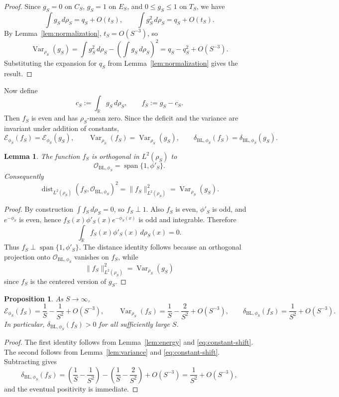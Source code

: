 \documentclass[11pt]{amsart}
\newtheorem{proposition}[theorem]{Proposition}
\newtheorem{lemma}[theorem]{Lemma}
\theoremstyle{remark}
\DeclareMathOperator{\Var}{Var}
\DeclareMathOperator{\dist}{dist}
\DeclareMathOperator{\spanop}{span}
\newcommand{\R}{\mathbb R}
\newcommand{\cO}{\mathcal O}
\newcommand{\BL}{\mathrm{BL}}
\begin{document}
\begin{proof}
Since $g_S=0$ on $C_S$, $g_S=1$ on $E_S$, and $0\le g_S\le 1$ on $T_S$, we
have
\[
  \int g_S\,d\rho_S=q_S+O(t_S),
  \qquad
  \int g_S^2\,d\rho_S=q_S+O(t_S).
\]
By Lemma~\ref{lem:normalization}, $t_S=O(S^{-3})$, so
\[
  \Var_{\rho_S}(g_S)
  =
  \int g_S^2\,d\rho_S-\left(\int g_S\,d\rho_S\right)^2
  =
  q_S-q_S^2+O(S^{-3}).
\]
Substituting the expansion for $q_S$ from
Lemma~\ref{lem:normalization} gives the result.
\end{proof}

Now define
\[
  c_S:=\int_{\R}g_S\,d\rho_S,
  \qquad
  f_S:=g_S-c_S.
\]
Then $f_S$ is even and has $\rho_S$-mean zero. Since the deficit and the
variance are invariant under addition of constants,
\begin{equation}\label{eq:constant-shift}
  \mathcal E_{\phi_S}(f_S)=\mathcal E_{\phi_S}(g_S),
  \qquad
  \Var_{\rho_S}(f_S)=\Var_{\rho_S}(g_S),
  \qquad
  \delta_{\BL,\phi_S}(f_S)=\delta_{\BL,\phi_S}(g_S).
\end{equation}

\begin{lemma}\label{lem:orth}
The function $f_S$ is orthogonal in $L^2(\rho_S)$ to
\[
  \cO_{\BL,\phi_S}=\spanop\{1,\phi'_S\}.
\]
Consequently
\[
  \dist_{L^2(\rho_S)}(f_S,\cO_{\BL,\phi_S})^2
  =
  \|f_S\|_{L^2(\rho_S)}^2
  =
  \Var_{\rho_S}(g_S).
\]
\end{lemma}

\begin{proof}
By construction $\int f_S\,d\rho_S=0$, so $f_S\perp 1$. Also $f_S$ is even,
$\phi'_S$ is odd, and $e^{-\phi_S}$ is even, hence
$f_S(x)\phi'_S(x)e^{-\phi_S(x)}$ is odd and integrable. Therefore
\[
  \int_{\R}f_S(x)\phi'_S(x)\,d\rho_S(x)=0.
\]
Thus $f_S\perp \spanop\{1,\phi'_S\}$. The distance identity follows because an
orthogonal projection onto $\cO_{\BL,\phi_S}$ vanishes on $f_S$, while
\[
  \|f_S\|_{L^2(\rho_S)}^2=\Var_{\rho_S}(g_S)
\]
since $f_S$ is the centered version of $g_S$.
\end{proof}

\begin{proposition}\label{prop:asymptotics}
As $S\to\infty$,
\[
  \mathcal E_{\phi_S}(f_S)=\frac{1}{S}-\frac{1}{S^2}+O(S^{-3}),
  \qquad
  \Var_{\rho_S}(f_S)=\frac{1}{S}-\frac{2}{S^2}+O(S^{-3}),
  \qquad
  \delta_{\BL,\phi_S}(f_S)=\frac{1}{S^2}+O(S^{-3}).
\]
In particular, $\delta_{\BL,\phi_S}(f_S)>0$ for all sufficiently large $S$.
\end{proposition}

\begin{proof}
The first identity follows from Lemma~\ref{lem:energy} and
\eqref{eq:constant-shift}. The second follows from Lemma~\ref{lem:variance}
and \eqref{eq:constant-shift}. Subtracting gives
\[
  \delta_{\BL,\phi_S}(f_S)
  =
  \left(\frac{1}{S}-\frac{1}{S^2}\right)
  -
  \left(\frac{1}{S}-\frac{2}{S^2}\right)
  +O(S^{-3})
  =
  \frac{1}{S^2}+O(S^{-3}),
\]
and the eventual positivity is immediate.
\end{proof}
\end{document}
